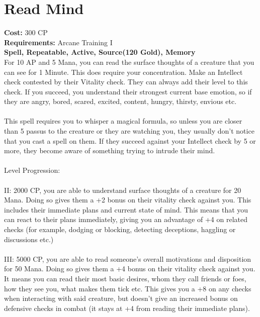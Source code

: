 \section{Read Mind}
\textbf{Cost:} 300 CP\\
\textbf{Requirements:}  Arcane Training I\\
\textbf{Spell, Repeatable, Active, Source(120 Gold), Memory}\\
For 10 AP and 5 Mana, you can read the surface thoughts of a creature that you can see for 1 Minute. This does require your concentration. Make an Intellect check contested by their Vitality check. They can always add their level to this check. If you succeed, you understand their strongest current base emotion, so if they are angry, bored, scared, excited, content, hungry, thirsty, envious etc.\\
\\
This spell requires you to whisper a magical formula, so unless you are closer than 5 passus to the creature or they are watching you, they usually don't notice that you cast a spell on them. If they succeed against your Intellect check by 5 or more, they become aware of something trying to intrude their mind.\\
\\
Level Progression:\\
\\
II: 2000 CP, you are able to understand surface thoughts of a creature for 20 Mana. Doing so gives them a +2 bonus on their vitality check against you. This includes their immediate plans and current state of mind. This means that you can react to their plans immediately, giving you an advantage of +4 on related checks (for example, dodging or blocking, detecting deceptions, haggling or discussions etc.)\\
\\
III: 5000 CP, you are able to read someone's overall motivations and disposition for 50 Mana. Doing so gives them a +4 bonus on their vitality check against you. It means you can read their most basic desires, whom they call friends or foes, how they see you, what makes them tick etc. This gives you a +8 on any checks when interacting with said creature, but doesn't give an increased bonus on defensive checks in combat (it stays at +4 from reading their immediate plans).\\
